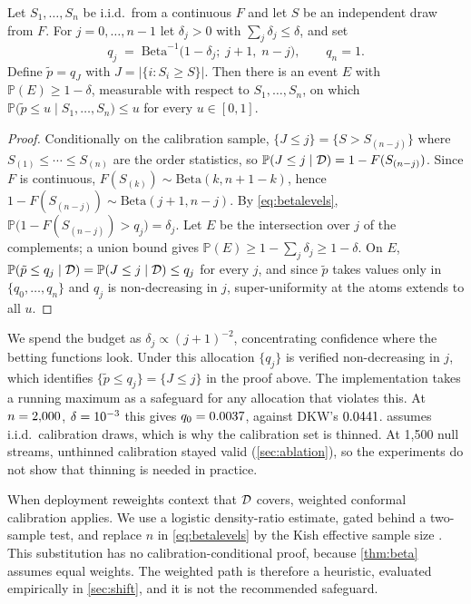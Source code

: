 \begin{theorem}
\label{thm:beta}
Let $S_1,\dots,S_n$ be i.i.d.\ from a continuous $F$ and let $S$ be an
independent draw from $F$. For $j = 0,\dots,n-1$ let $\delta_j > 0$ with
$\sum_j \delta_j \le \delta$, and set
\begin{equation}
\label{eq:betalevels}
  q_j \;=\; \mathrm{Beta}^{-1}\bigl(1-\delta_j;\; j+1,\; n-j\bigr),
  \qquad q_n = 1 .
\end{equation}
Define $\tilde p = q_{J}$ with $J = |\{i : S_i \ge S\}|$. Then there is an event
$E$ with $\mathbb{P}(E) \ge 1-\delta$, measurable with respect to
$S_1,\dots,S_n$, on which
$\mathbb{P}\bigl(\tilde p \le u \mid S_1,\dots,S_n\bigr) \le u$
for every $u \in [0,1]$.
\end{theorem}

\begin{proof}
Conditionally on the calibration sample, $\{J \le j\} = \{S > S_{(n-j)}\}$ where
$S_{(1)} \le \cdots \le S_{(n)}$ are the order statistics, so
$\mathbb{P}(J \le j \mid \mathcal{D}) = 1 - F(S_{(n-j)})$. Since $F$ is continuous,
$F(S_{(k)}) \sim \mathrm{Beta}(k, n+1-k)$, hence
$1 - F(S_{(n-j)}) \sim \mathrm{Beta}(j+1, n-j)$. By \cref{eq:betalevels},
$\mathbb{P}\bigl(1 - F(S_{(n-j)}) > q_j\bigr) = \delta_j$. Let $E$ be the
intersection over $j$ of the complements; a union bound gives
$\mathbb{P}(E) \ge 1 - \sum_j \delta_j \ge 1-\delta$. On $E$,
$\mathbb{P}(\tilde p \le q_j \mid \mathcal{D}) = \mathbb{P}(J \le j \mid \mathcal{D}) \le q_j$
for every $j$, and since $\tilde p$ takes values only in $\{q_0,\dots,q_n\}$
and $q_j$ is non-decreasing in $j$, super-uniformity at the atoms extends to all
$u$.
\end{proof}

We spend the budget as $\delta_j \propto (j+1)^{-2}$, concentrating confidence where the betting functions look. Under this allocation $\{q_j\}$ is verified non-decreasing in $j$, which identifies $\{\tilde p \le q_j\} = \{J \le j\}$ in the proof above. The implementation takes a running maximum as a safeguard for any allocation that violates this. At $n=2{,}000{}$, $\delta=10^{-3}{}$ this gives $q_0 = 0.0037{}$, against DKW's $0.0441{}$.  assumes i.i.d.\ calibration draws, which is why the calibration set is thinned. At 1,500 null streams, unthinned calibration stayed valid (\cref{sec:ablation}), so the experiments do not show that thinning is needed in practice.

When deployment reweights context that $\mathcal{D}$ covers, weighted conformal calibration \citep{tibshirani2019covariate} applies. We use a logistic density-ratio estimate, gated behind a two-sample test, and replace $n$ in \cref{eq:betalevels} by the Kish effective sample size \citep{kish1965}. This substitution has no calibration-conditional proof, because \cref{thm:beta} assumes equal weights. The weighted path is therefore a heuristic, evaluated empirically in \cref{sec:shift}, and it is not the recommended safeguard.

